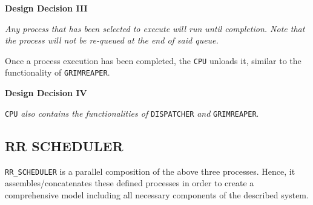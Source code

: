 \documentclass[]{article}
\begin{document}
\begin{mdframed}[backgroundcolor=lightgray!40]
	\textbf{Design Decision III} \par 
	\textit{Any process that has been selected to execute will run until completion. Note that the process will not be re-queued at the end of said queue.}
\end{mdframed}

\vspace{2mm}

Once a process execution has been completed, the \verb|CPU| unloads it, similar to the functionality of \verb|GRIMREAPER|. 

\vspace{2mm}

\begin{mdframed}[backgroundcolor=lightgray!40]
	\textbf{Design Decision IV} \par 
	\verb|CPU| \textit{also contains the functionalities of} \verb|DISPATCHER| \textit{and} \verb|GRIMREAPER|.
\end{mdframed}

\subsection*{RR SCHEDULER}
\verb|RR_SCHEDULER| is a parallel composition of the above three processes. Hence, it assembles/concatenates these defined processes in order to create a comprehensive model including all necessary components of the described system.
\end{document}
